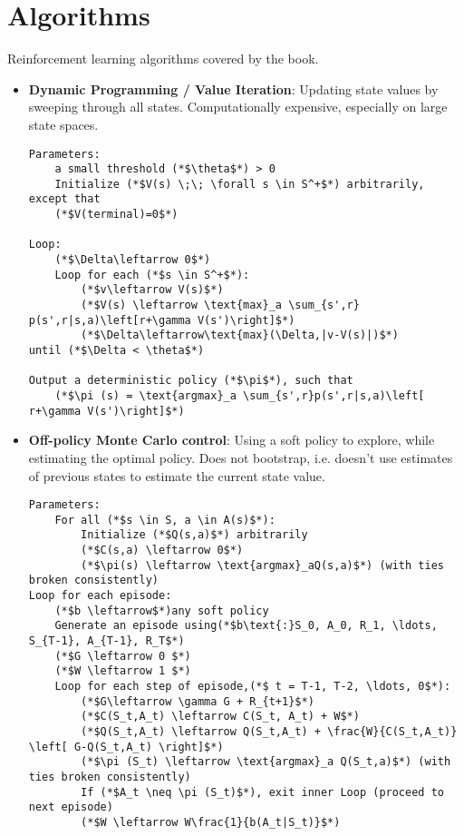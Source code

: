 \documentclass[12pt]{article}
\begin{document}
\section{Algorithms}
Reinforcement learning algorithms covered by the book.
\begin{itemize}
	\item\textbf{Dynamic Programming / Value Iteration}: Updating state values by sweeping through all states.
		Computationally expensive, especially on large state spaces.
	\begin{lstlisting}
Parameters:
	a small threshold (*$\theta$*) > 0 
	Initialize (*$V(s) \;\; \forall s \in S^+$*) arbitrarily, except that
	(*$V(terminal)=0$*) 

Loop:
	(*$\Delta\leftarrow 0$*)
	Loop for each (*$s \in S^+$*):
		(*$v\leftarrow V(s)$*)
		(*$V(s) \leftarrow \text{max}_a \sum_{s',r} p(s',r|s,a)\left[r+\gamma V(s')\right]$*)
		(*$\Delta\leftarrow\text{max}(\Delta,|v-V(s)|)$*)
until (*$\Delta < \theta$*)

Output a deterministic policy (*$\pi$*), such that
	(*$\pi (s) = \text{argmax}_a \sum_{s',r}p(s',r|s,a)\left[ r+\gamma V(s')\right]$*)
		\end{lstlisting}

	\item\textbf{Off-policy Monte Carlo control}: Using a soft policy to explore, while estimating the
		optimal policy. Does not bootstrap, i.e. doesn't use estimates of previous states to estimate the
		current state value.
			\begin{lstlisting}
Parameters:
	For all (*$s \in S, a \in A(s)$*):
		Initialize (*$Q(s,a)$*) arbitrarily
		(*$C(s,a) \leftarrow 0$*)
		(*$\pi(s) \leftarrow \text{argmax}_aQ(s,a)$*) (with ties broken consistently)
Loop for each episode:
	(*$b \leftarrow$*)any soft policy
	Generate an episode using(*$b\text{:}S_0, A_0, R_1, \ldots, S_{T-1}, A_{T-1}, R_T$*)
	(*$G \leftarrow 0 $*)
	(*$W \leftarrow 1 $*)
	Loop for each step of episode,(*$ t = T-1, T-2, \ldots, 0$*):
		(*$G\leftarrow \gamma G + R_{t+1}$*)
		(*$C(S_t,A_t) \leftarrow C(S_t, A_t) + W$*)
		(*$Q(S_t,A_t) \leftarrow Q(S_t,A_t) + \frac{W}{C(S_t,A_t)} \left[ G-Q(S_t,A_t) \right]$*)
		(*$\pi (S_t) \leftarrow \text{argmax}_a Q(S_t,a)$*) (with ties broken consistently)
		If (*$A_t \neq \pi (S_t)$*), exit inner Loop (proceed to next episode)
		(*$W \leftarrow W\frac{1}{b(A_t|S_t)}$*)
			\end{lstlisting}


\end{itemize}
\end{document}
